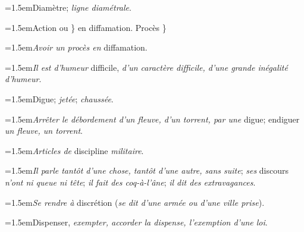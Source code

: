 \par{\dictfontsize\hangindent=1.5em\noindent Diamètre; \textit{ligne diamétrale}. \par}
\par{\dictfontsize\hangindent=1.5em\noindent Action ou \} en diffamation. Procès \} \par}
\par{\dictfontsize\hangindent=1.5em\noindent \textit{Avoir un procès en} diffamation. \par}
\par{\dictfontsize\hangindent=1.5em\noindent \textit{Il est d’humeur} difficile, \textit{d’un caractère difficile, d’une grande inégalité d’humeur}. \par}
\par{\dictfontsize\hangindent=1.5em\noindent Digue; \textit{jetée}; \textit{chaussée}. \par}
\par{\dictfontsize\hangindent=1.5em\noindent \textit{Arrêter le débordement d’un fleuve, d’un torrent, par une} digue; endiguer \textit{un fleuve, un torrent}. \par}
\par{\dictfontsize\hangindent=1.5em\noindent \textit{Articles de} discipline \textit{militaire}. \par}
\par{\dictfontsize\hangindent=1.5em\noindent \textit{Il parle tantôt d’une chose, tantôt d’une autre, sans suite}; \textit{ses} discours \textit{n’ont ni queue ni tête}; \textit{il fait des coq-à-l’âne}; \textit{il dit des extravagances}. \par}
\par{\dictfontsize\hangindent=1.5em\noindent \textit{Se rendre à} discrétion (\textit{se dit d’une armée ou d’une ville prise}). \par}
\par{\dictfontsize\hangindent=1.5em\noindent Dispenser, \textit{exempter, accorder la dispense, l’exemption d’une loi}. \par}
